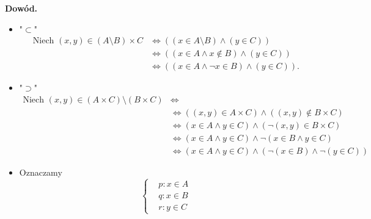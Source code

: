 \documentclass[a5paper,8pt]{article}
\theoremstyle{mythmstyle}
\begin{document}
            \textbf{Dowód.}
            \begin{itemize}
                \item "$ \subset $"
                    \begin{align*}
                        \text{Niech  } (x, y) \in (A \setminus B) \times C &\iff 
                        ((x \in A \setminus B) \wedge (y \in C)) \\
                        &\iff ((x \in A \wedge x \notin B) \wedge (y \in C)) \\
                        &\iff ((x \in A \wedge \neg x \in B) \wedge (y \in C)).
                    \end{align*}

                \item "$ \supset $"
                    \begin{align*}
                        \text{Niech  } (x, y) \in (A \times C) \setminus (B \times C) &\iff \\
                        &\iff((x, y) \in A \times C) \wedge ((x, y) \notin B \times C) \\
                        &\iff(x \in A \wedge y \in C) \wedge (\neg (x, y) \in B \times C)  \\
                        &\iff(x \in A \wedge y \in C) \wedge \neg(x \in B \wedge y \in C)  \\
                        &\iff(x \in A \wedge y \in C) \wedge (\neg(x \in B) \wedge \neg(y \in C))
                    \end{align*}

                \item Oznaczamy
                    \begin{equation*}
                      \begin{cases}
                        &p: x \in A \\
                        &q : x \in B \\
                        &r : y \in C
                      \end{cases}
                    \end{equation*}
            \end{itemize}


            
\end{document}
